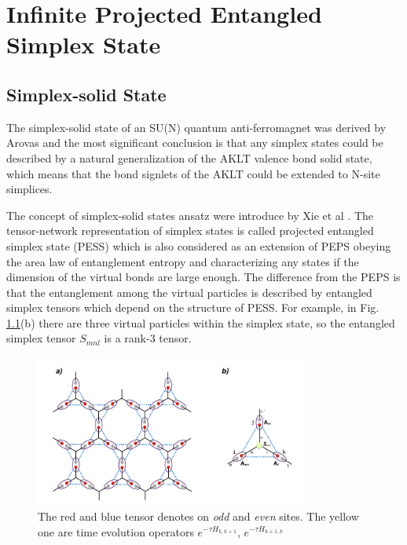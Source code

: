 \chapter{Infinite Projected Entangled Simplex State}
\label{chapter:ipess}
\section{Simplex-solid State}
\label{solidstate}
The simplex-solid state of an SU(N) quantum anti-ferromagnet was derived by Arovas \cite{} and the most significant conclusion is that any simplex states could be described by a natural generalization of the AKLT \cite{} valence bond solid state, which means that the bond signlets of the AKLT could be extended to N-site simplices.

The concept of simplex-solid states ansatz were introduce by Xie et al \cite{}. The tensor-network representation of simplex states is called projected entangled simplex state (PESS) which is also considered as an extension of PEPS \cite{} obeying the area law of entanglement entropy and characterizing any states if the dimension of the virtual bonds are large enough. The difference from the PEPS is that the entanglement among the virtual particles is described by entangled simplex tensors which depend on the structure of PESS. For example, in Fig. \ref{fig411}(b) there are three virtual particles within the simplex state, so the entangled simplex tensor $S_{mnl}$ is a rank-3 tensor.

\begin{figure}[ht]
	\centering
	\includegraphics[width=0.80\textwidth]{figures/fig411.png}
	\caption[The picture of the main idea of itebd.]{The red and blue tensor denotes on \textit{odd} and \textit{even} sites. The yellow one are time evolution operators $e^{-\tau H_{k,k+1}}$, $e^{-\tau H_{k+1,k}}$}
	\label{fig411}
\end{figure}

